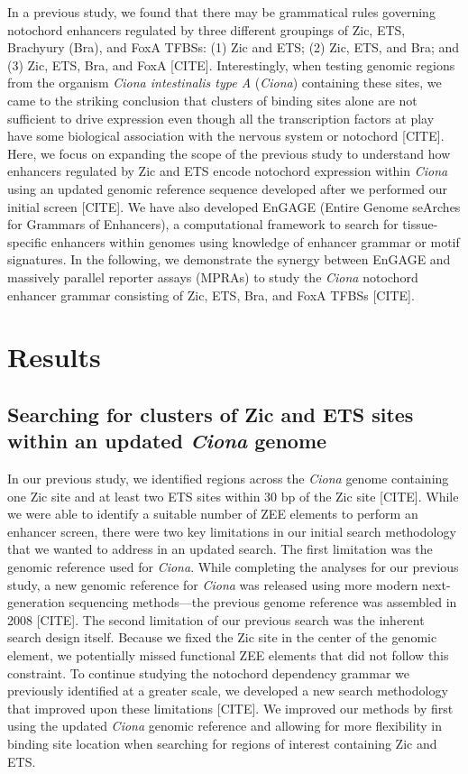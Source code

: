 In a previous study, we found that there may be grammatical rules governing notochord enhancers regulated by three different groupings of Zic, ETS, Brachyury (Bra), and FoxA TFBSs: (1) Zic and ETS; (2) Zic, ETS, and Bra; and (3) Zic, ETS, Bra, and FoxA [CITE]. Interestingly, when testing genomic regions from the organism \textit{Ciona intestinalis type A} (\textit{Ciona}) containing these sites, we came to the striking conclusion that clusters of binding sites alone are not sufficient to drive expression even though all the transcription factors at play have some biological association with the nervous system or notochord [CITE]. Here, we focus on expanding the scope of the previous study to understand how enhancers regulated by Zic and ETS encode notochord expression within \textit{Ciona} using an updated genomic reference sequence developed after we performed our initial screen [CITE]. We have also developed EnGAGE (Entire Genome seArches for Grammars of Enhancers), a computational framework to search for tissue-specific enhancers within genomes using knowledge of enhancer grammar or motif signatures. In the following, we demonstrate the synergy between EnGAGE and massively parallel reporter assays (MPRAs) to study the \textit{Ciona} notochord enhancer grammar consisting of Zic, ETS, Bra, and FoxA TFBSs [CITE]. 

\section{Results}

\subsection{Searching for clusters of Zic and ETS sites within an updated \textit{Ciona} genome}

In our previous study, we identified regions across the \textit{Ciona} genome containing one Zic site and at least two ETS sites within 30 bp of the Zic site [CITE]. While we were able to identify a suitable number of ZEE elements to perform an enhancer screen, there were two key limitations in our initial search methodology that we wanted to address in an updated search. The first limitation was the genomic reference used for \textit{Ciona}. While completing the analyses for our previous study, a new genomic reference for \textit{Ciona} was released using more modern next-generation sequencing methods—the previous genome reference was assembled in 2008 [CITE]. The second limitation of our previous search was the inherent search design itself. Because we fixed the Zic site in the center of the genomic element, we potentially missed functional ZEE elements that did not follow this constraint. To continue studying the notochord dependency grammar we previously identified at a greater scale, we developed a new search methodology that improved upon these limitations [CITE]. We improved our methods by first using the updated \textit{Ciona} genomic reference and allowing for more flexibility in binding site location when searching for regions of interest containing Zic and ETS. 

